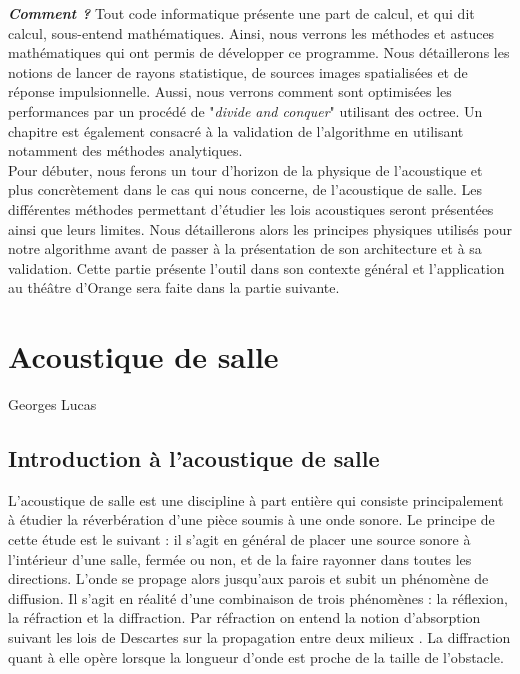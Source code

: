 \textit{\textbf{Comment ?}} Tout code informatique présente une part de calcul, et qui dit calcul, sous-entend mathématiques. Ainsi, nous verrons les méthodes et astuces mathématiques qui ont permis de développer ce programme. Nous détaillerons les notions de lancer de rayons statistique, de sources images spatialisées et de réponse impulsionnelle. Aussi, nous verrons comment sont optimisées les performances par un procédé de "\textit{divide and conquer}" utilisant des \gls{octree}. Un chapitre est également consacré à la validation de l'algorithme en utilisant notamment des méthodes analytiques.\\

Pour débuter, nous ferons un tour d'horizon de la physique de l'acoustique et plus concrètement dans le cas qui nous concerne, de l'acoustique de salle. Les différentes méthodes permettant d'étudier les lois acoustiques seront présentées ainsi que leurs limites. Nous détaillerons alors les principes physiques utilisés pour notre algorithme avant de passer à la présentation de son architecture et à sa validation. Cette partie présente l'outil dans son contexte général et l'application au théâtre d'Orange sera faite dans la partie suivante.


\chapter{Acoustique de salle}
			{Georges Lucas}
		\minitoc
		\newpage
		
\section{Introduction à l'acoustique de salle}
L'acoustique de salle est une discipline à part entière qui consiste principalement à étudier la réverbération d'une pièce soumis à une onde sonore. Le principe de cette étude est le suivant : il s'agit en général de placer une source sonore à l'intérieur d'une salle, fermée ou non, et de la faire rayonner dans toutes les directions. L'onde se propage alors jusqu'aux parois et subit un phénomène de diffusion. Il s'agit en réalité d'une combinaison de trois phénomènes : la réflexion, la réfraction et la diffraction. Par réfraction on entend la notion d'absorption suivant les lois de Descartes sur la propagation entre deux milieux \cite[p. 3]{jouhaneau}. La diffraction quant à elle opère lorsque la longueur d'onde est proche de la taille de l'obstacle. 

